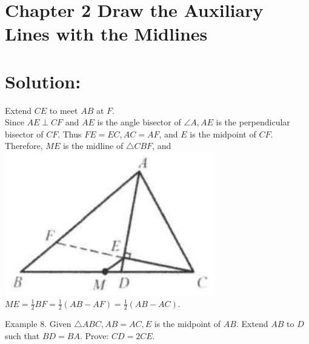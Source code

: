 \documentclass[10pt]{article}
\begin{document}
\section*{Chapter 2 Draw the Auxiliary Lines with the Midlines}
\section*{Solution:}
Extend \(C E\) to meet \(A B\) at \(F\).\\
Since \(A E \perp C F\) and \(A E\) is the angle bisector of \(\angle A, A E\) is the perpendicular bisector of \(C F\). Thus \(F E=E C, A C=A F\), and \(E\) is the midpoint of \(C F\).\\
Therefore, \(M E\) is the midline of \(\triangle C B F\), and\\
\includegraphics[max width=\textwidth, center]{2025_04_17_97bc1f7e44d93c271a88g-039(3)}\\
\(M E=\frac{1}{2} B F=\frac{1}{2}(A B-A F)=\frac{1}{2}(A B-A C)\).

Example 8. Given \(\triangle A B C, A B=A C, E\) is the midpoint of \(A B\). Extend \(A B\) to \(D\) such that \(B D=B A\). Prove: \(C D=2 C E\).
\end{document}
